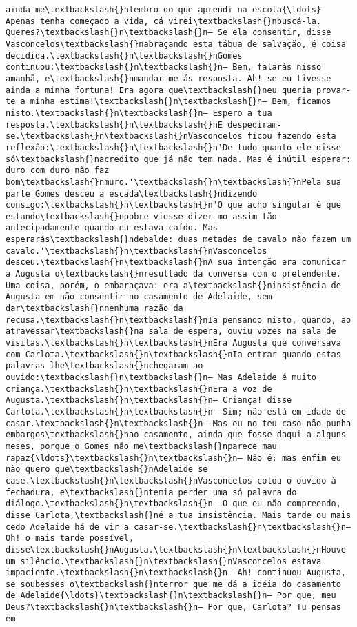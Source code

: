 \begin{Verbatim}[commandchars=\\\{\}]
ainda me\textbackslash{}nlembro do que aprendi na escola{\ldots} Apenas tenha começado a vida, cá virei\textbackslash{}nbuscá-la. Queres?\textbackslash{}n\textbackslash{}n— Se ela consentir, disse Vasconcelos\textbackslash{}nabraçando esta tábua de salvação, é coisa decidida.\textbackslash{}n\textbackslash{}nGomes continuou:\textbackslash{}n\textbackslash{}n— Bem, falarás nisso amanhã, e\textbackslash{}nmandar-me-ás resposta. Ah! se eu tivesse ainda a minha fortuna! Era agora que\textbackslash{}neu queria provar-te a minha estima!\textbackslash{}n\textbackslash{}n— Bem, ficamos nisto.\textbackslash{}n\textbackslash{}n— Espero a tua resposta.\textbackslash{}n\textbackslash{}nE despediram-se.\textbackslash{}n\textbackslash{}nVasconcelos ficou fazendo esta reflexão:\textbackslash{}n\textbackslash{}n'De tudo quanto ele disse só\textbackslash{}nacredito que já não tem nada. Mas é inútil esperar: duro com duro não faz bom\textbackslash{}nmuro.'\textbackslash{}n\textbackslash{}nPela sua parte Gomes desceu a escada\textbackslash{}ndizendo consigo:\textbackslash{}n\textbackslash{}n'O que acho singular é que estando\textbackslash{}npobre viesse dizer-mo assim tão antecipadamente quando eu estava caído. Mas esperarás\textbackslash{}ndebalde: duas metades de cavalo não fazem um cavalo.'\textbackslash{}n\textbackslash{}nVasconcelos desceu.\textbackslash{}n\textbackslash{}nA sua intenção era comunicar a Augusta o\textbackslash{}nresultado da conversa com o pretendente. Uma coisa, porém, o embaraçava: era a\textbackslash{}ninsistência de Augusta em não consentir no casamento de Adelaide, sem dar\textbackslash{}nnenhuma razão da recusa.\textbackslash{}n\textbackslash{}nIa pensando nisto, quando, ao atravessar\textbackslash{}na sala de espera, ouviu vozes na sala de visitas.\textbackslash{}n\textbackslash{}nEra Augusta que conversava com Carlota.\textbackslash{}n\textbackslash{}nIa entrar quando estas palavras lhe\textbackslash{}nchegaram ao ouvido:\textbackslash{}n\textbackslash{}n— Mas Adelaide é muito criança.\textbackslash{}n\textbackslash{}nEra a voz de Augusta.\textbackslash{}n\textbackslash{}n— Criança! disse Carlota.\textbackslash{}n\textbackslash{}n— Sim; não está em idade de casar.\textbackslash{}n\textbackslash{}n— Mas eu no teu caso não punha embargos\textbackslash{}nao casamento, ainda que fosse daqui a alguns meses, porque o Gomes não me\textbackslash{}nparece mau rapaz{\ldots}\textbackslash{}n\textbackslash{}n— Não é; mas enfim eu não quero que\textbackslash{}nAdelaide se case.\textbackslash{}n\textbackslash{}nVasconcelos colou o ouvido à fechadura, e\textbackslash{}ntemia perder uma só palavra do diálogo.\textbackslash{}n\textbackslash{}n— O que eu não compreendo, disse Carlota,\textbackslash{}né a tua insistência. Mais tarde ou mais cedo Adelaide há de vir a casar-se.\textbackslash{}n\textbackslash{}n— Oh! o mais tarde possível, disse\textbackslash{}nAugusta.\textbackslash{}n\textbackslash{}nHouve um silêncio.\textbackslash{}n\textbackslash{}nVasconcelos estava impaciente.\textbackslash{}n\textbackslash{}n— Ah! continuou Augusta, se soubesses o\textbackslash{}nterror que me dá a idéia do casamento de Adelaide{\ldots}\textbackslash{}n\textbackslash{}n— Por que, meu Deus?\textbackslash{}n\textbackslash{}n— Por que, Carlota? Tu pensas em 
\end{Verbatim}
